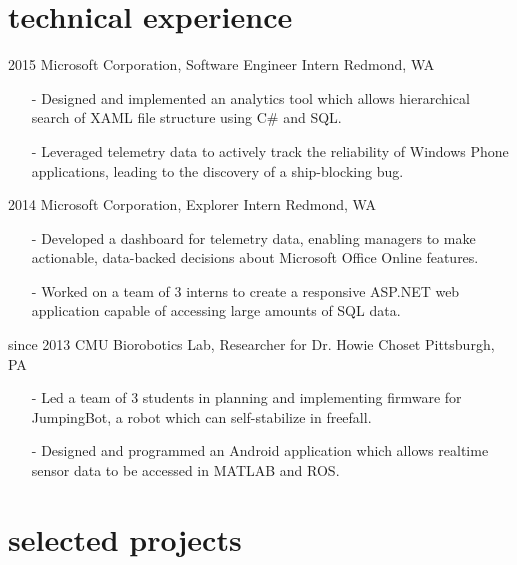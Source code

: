\documentclass[]{friggeri-cv}
\begin{document}
    \section{technical experience}

    \begin{entrylist}
        \entrys
            {2015}
            {Microsoft Corporation, {\normalfont Software Engineer Intern}}
            {Redmond, WA}
            {\begin{itemize}[leftmargin=*]
                \item[-] Designed and implemented an analytics tool which allows hierarchical search of XAML file structure using C\# and SQL.
                \item[-] Leveraged telemetry data to actively track the reliability of Windows Phone applications, leading to the discovery of a ship-blocking bug.
             \end{itemize}}
        \entrys
            {2014}
            {Microsoft Corporation, {\normalfont Explorer Intern}}
            {Redmond, WA}
            {\begin{itemize}[leftmargin=*]
                \item[-] Developed a dashboard for telemetry data, enabling managers to make actionable, data-backed decisions about Microsoft Office Online features.
                \item[-] Worked on a team of 3 interns to create a responsive ASP.NET web application capable of accessing large amounts of SQL data.
             \end{itemize}}
        \entrys
            {since 2013}
            {CMU Biorobotics Lab, {\normalfont Researcher for Dr. Howie Choset}}
            {Pittsburgh, PA}
            {\begin{itemize}[leftmargin=*]
                \item[-] Led a team of 3 students in planning and implementing firmware for JumpingBot, a robot which can self-stabilize in freefall.
                \item[-] Designed and programmed an Android application which allows realtime sensor data to be accessed in MATLAB and ROS.
            \end{itemize}}
    \end{entrylist}

    \section{selected projects}
\end{document}

